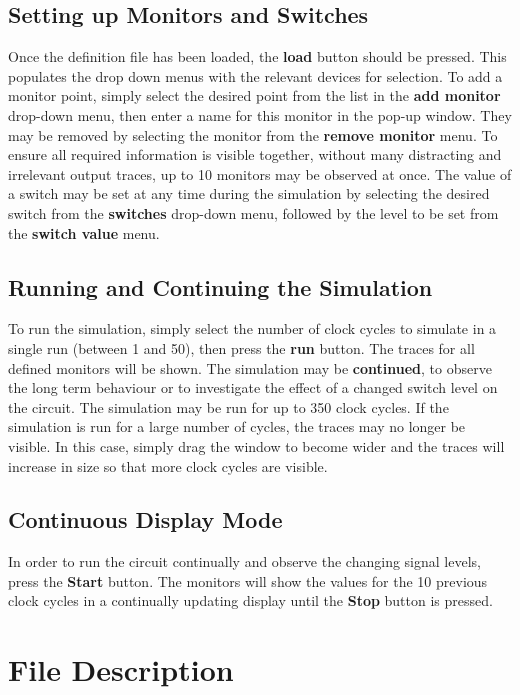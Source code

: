 \documentclass[a4paper,10pt]{article}  %
\begin{document}
\subsection*{Setting up Monitors and Switches}

Once the definition file has been loaded, the \textbf{load} button
should be pressed. This populates the drop down menus with the
relevant devices for selection. To add a monitor point, simply select
the desired point from the list in the \textbf{add monitor}
drop-down menu, then enter a name for this monitor in the pop-up
window. They may be removed by selecting the monitor from the
\textbf{remove monitor} menu. To ensure all required information is
visible together, without many distracting and irrelevant output
traces, up to 10 monitors may be observed at once. The value of a
switch may be set at any time during the simulation by selecting the
desired switch from the \textbf{switches} drop-down menu, followed by
the level to be set from the \textbf{switch value} menu.

\subsection*{Running and Continuing the Simulation}

To run the simulation, simply select the number of clock cycles to
simulate in a single run (between 1 and 50), then press the
\textbf{run} button. The traces for all defined monitors will be
shown. The simulation may be \textbf{continued}, to observe the long
term behaviour or to investigate the effect of a changed switch level
on the circuit. The simulation may be run for up to 350 clock
cycles. If the simulation is run for a large number of cycles, the
traces may no longer be visible. In this case, simply drag the window
to become wider and the traces will increase in size so that more
clock cycles are visible.

\subsection*{Continuous Display Mode}

In order to run the circuit continually and observe the changing
signal levels, press the \textbf{Start} button. The monitors will show
the values for the 10 previous clock cycles in a continually updating
display until the \textbf{Stop} button is pressed.

\section{File Description}
\label{sec:file-description}
\end{document}
